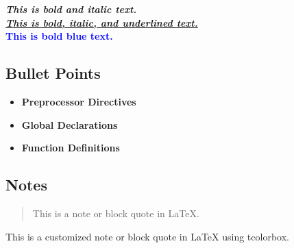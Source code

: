 \textbf{\textit{This is bold and italic text.}}\\
\underline{\textbf{\textit{This is bold, italic, and underlined text.}}}\\
\textcolor{blue}{\textbf{This is bold blue text.}}

\subsection{Bullet Points}
\begin{itemize}
    \item \textbf{Preprocessor Directives}
    \item \textbf{Global Declarations}
    \item \textbf{Function Definitions}
\end{itemize}

\subsection{Notes}
\begin{quote}
    This is a note or block quote in LaTeX.
\end{quote}
\begin{tcolorbox}[colback=yellow!10!white, colframe=yellow!50!black, title=Note]
    This is a customized note or block quote in LaTeX using tcolorbox.
\end{tcolorbox}